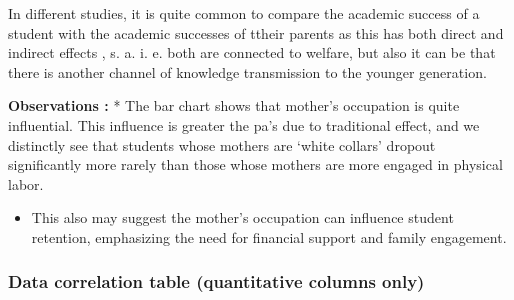 \documentclass[
  letterpaper,
  DIV=11,
  numbers=noendperiod]{scrartcl}
\providecommand{\tightlist}{%
  \setlength{\itemsep}{0pt}\setlength{\parskip}{0pt}}\usepackage{longtable,booktabs,array}
\begin{document}
In different studies, it is quite common to compare the academic success
of a student with the academic successes of ttheir parents as this has
both direct and indirect effects , s. a. i. e. both are connected to
welfare, but also it can be that there is another channel of knowledge
transmission to the younger generation.

\textbf{Observations :} * The bar chart shows that mother's occupation
is quite influential. This influence is greater the pa's due to
traditional effect, and we distinctly see that students whose mothers
are \enquote*{white collars} dropout significantly more rarely than
those whose mothers are more engaged in physical labor.

\begin{itemize}
\tightlist
\item
  This also may suggest the mother's occupation can influence student
  retention, emphasizing the need for financial support and family
  engagement.
\end{itemize}

\hypertarget{data-correlation-table-quantitative-columns-only}{%
\subsubsection{Data correlation table (quantitative columns
only)}\label{data-correlation-table-quantitative-columns-only}}
\end{document}
